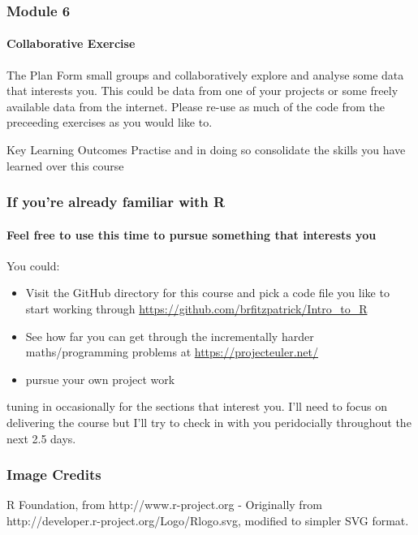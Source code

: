 \documentclass[xcolor=dvipsnames]{beamer}
\begin{document}
\begin{frame}
\frametitle{Module 6}
\framesubtitle{Collaborative Exercise}
\begin{block}{The Plan}
Form small groups and collaboratively explore and analyse some data that interests you.
This could be data from one of your projects or some freely available data from the internet.
Please re-use as much of the code from the preceeding exercises as you would like to.
\end{block}

\begin{block}{Key Learning Outcomes}
Practise and in doing so consolidate the skills you have learned over this course
\end{block}
\end{frame}

\begin{frame}
\frametitle{If you're already familiar with R}
\framesubtitle{Feel free to use this time to pursue something that interests you}
You could:
\begin{itemize}
\item Visit the GitHub directory for this course and pick a code file you like to start working through \url{https://github.com/brfitzpatrick/Intro_to_R}
\item See how far you can get through the incrementally harder maths/programming problems at \url{https://projecteuler.net/}
\item pursue your own project work
\end{itemize}
tuning in occasionally for the sections that interest you.
\newline
\newline
I'll need to focus on delivering the course but I'll try to check in with you peridocially throughout the next 2.5 days.
\end{frame}

\begin{frame} 
\frametitle{Image Credits}
R Foundation, from http://www.r-project.org - Originally from http://developer.r-project.org/Logo/Rlogo.svg, modified to simpler SVG format.
%
\end{frame}
\end{document}
